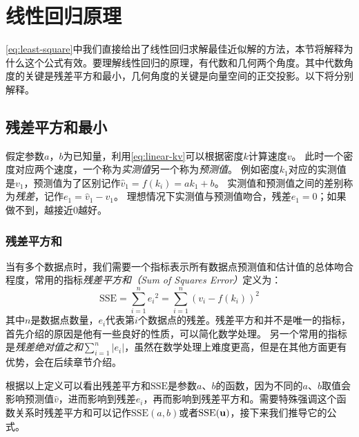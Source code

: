 \section{线性回归原理}

\cref{eq:least-square}中我们直接给出了线性回归求解最佳近似解的方法，本节将解释为什么这个公式有效。要理解线性回归的原理，有代数和几何两个角度。其中代数角度的关键是残差平方和最小，几何角度的关键是向量空间的正交投影。以下将分别解释。

\subsection{残差平方和最小}
假定参数$a$，$b$为已知量，利用\cref{eq:linear-kv}可以根据密度$k$计算速度$v$。
此时一个密度对应两个速度，一个称为\emph{实测值}另一个称为\emph{预测值}。
例如密度$k_1$对应的实测值是$v_1$，预测值为了区别记作$\hat{v}_1=f(k_i)=ak_1+b$。
\nolinebreak{}%
实测值和预测值之间的差别称为\emph{残差}，记作$e_1=\hat{v}_1-v_1$。
理想情况下实测值与预测值吻合，残差$e_1=0$；如果做不到，越接近$0$越好。

\subsubsection{残差平方和}

当有多个数据点时，我们需要一个指标表示所有数据点预测值和估计值的总体吻合程度，常用的指标\emph{残差平方和（Sum of Squares Error）}定义为：
\begin{equation}\label{eq:sse}
    \text{SSE}=\sum_{i=1}^n {e_i}^2=\sum_{i=1}^n (v_i-f(k_i))^2
\end{equation}
其中$n$是数据点数量，$e_i$代表第$i$个数据点的残差。残差平方和并不是唯一的指标，首先介绍的原因是他有一些良好的性质，可以简化数学处理。
另一个常用的指标是\emph{残差绝对值之和}$\sum_{i=1}^{n}|e_i|$，虽然在数学处理上难度更高，但是在其他方面更有优势，会在后续章节介绍。

根据以上定义可以看出残差平方和$\text{SSE}$是参数$a$、$b$的函数，因为不同的$a$、$b$取值会影响预测值$\hat{v}$，进而影响到残差$e_i$，再而影响到残差平方和。需要特殊强调这个函数关系时残差平方和可以记作$\text{SSE}(a,b)$或者$\text{SSE}(\mathbf{u})$，接下来我们推导它的公式。

